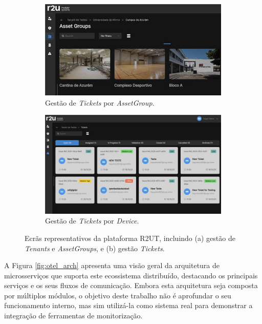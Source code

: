 \begin{figure}[H]
    \centering
        \begin{subfigure}[t]{0.48\textwidth}
        \includegraphics[width=\textwidth]{images/r2ut/dtx_1.jpg}
        \caption{Gestão de \textit{Tickets} por \textit{AssetGroup}.}
        \label{fig:r2utBoard}
    \end{subfigure}
    \hfill
    \begin{subfigure}[t]{0.48\textwidth}
        \includegraphics[width=\textwidth]{images/r2ut/dtx_2.jpg}
        \caption{Gestão de \textit{Tickets} por \textit{Device}.}
        \label{fig:r2utBoard_diagram}
    \end{subfigure}
    \caption{Ecrãs representativos da plataforma R2UT, incluindo (a) gestão de \textit{Tenants} e \textit{AssetGroups}, e (b) gestão \textit{Tickets}.}
    \label{fig:r2ut-ui}
\end{figure}

A Figura \ref{fig:otel_arch} apresenta uma visão geral da arquitetura de microsserviços que suporta este ecossistema distribuído, destacando os principais serviços e os seus fluxos de comunicação. Embora esta arquitetura seja composta por múltiplos módulos, o objetivo deste trabalho não é aprofundar o seu funcionamento interno, mas sim utilizá-la como sistema real para demonstrar a integração de ferramentas de monitorização. 


